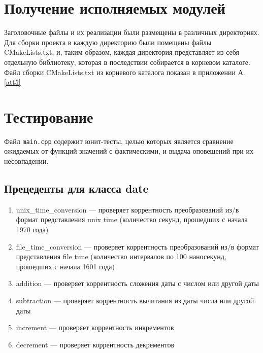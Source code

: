 \documentclass[a4paper,12pt]{article}
\begin{document}
\cleardoublepage

\section{Получение исполняемых модулей}

Заголовочные файлы и их реализации были размещены в различных директориях. Для сборки проекта в каждую директорию были помещены файлы CMakeLists.txt, и, таким образом, каждая директория представляет из себя отдельную библиотеку, которая в последствии собирается в корневом каталоге. Файл сборки CMakeLists.txt из корневого каталога показан в приложении А.\ref{att5}

\cleardoublepage

\section{Тестирование}

Файл \verb!main.cpp! содержит юнит-тесты, целью которых является сравнение ожидаемых от функций значений с фактическими, и выдача оповещений при их несовпадении.

\subsection{Прецеденты для класса date}

\begin{enumerate}

\item unix\_time\_conversion — проверяет коррентность преобразований из/в формат представления unix time (количество секунд, прошедших с начала 1970 года)

\item file\_time\_conversion — проверяет коррентность преобразований из/в формат представления file time (количество интервалов по 100 наносекунд, прошедших с начала 1601 года)
	
\item addition — проверяет коррентность сложения даты с числом или другой даты

\item subtraction — проверяет коррентность вычитания из даты числа или другой даты

\item increment — проверяет коррентность инкрементов

\item decrement — проверяет коррентность декрементов

\end{enumerate}
\end{document}
